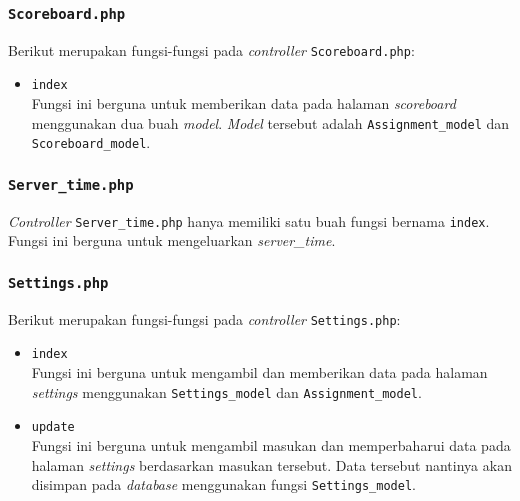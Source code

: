 \subsubsection{\texttt{Scoreboard.php}}
Berikut merupakan fungsi-fungsi pada \textit{controller} \texttt{Scoreboard.php}:
\begin{itemize}
	\item \texttt{index}\\
	Fungsi ini berguna untuk memberikan data pada halaman \textit{scoreboard} menggunakan dua buah \textit{model}. \textit{Model} tersebut adalah \texttt{Assignment\_model} dan \texttt{Scoreboard\_model}.
\end{itemize}
\subsubsection{\texttt{Server\_time.php}}
\textit{Controller} \texttt{Server\_time.php} hanya memiliki satu buah fungsi bernama \texttt{index}. Fungsi ini berguna untuk mengeluarkan \textit{server\_time}.

\subsubsection{\texttt{Settings.php}}
Berikut merupakan fungsi-fungsi pada \textit{controller} \texttt{Settings.php}:
\begin{itemize}
	\item \texttt{index}\\
	Fungsi ini berguna untuk mengambil dan memberikan data pada halaman \textit{settings} menggunakan \texttt{Settings\_model} dan \texttt{Assignment\_model}.
	\item \texttt{update}\\
	Fungsi ini berguna untuk mengambil masukan dan memperbaharui data pada halaman \textit{settings} berdasarkan masukan tersebut. Data tersebut nantinya akan disimpan pada \textit{database} menggunakan fungsi \texttt{Settings\_model}.  
\end{itemize}
